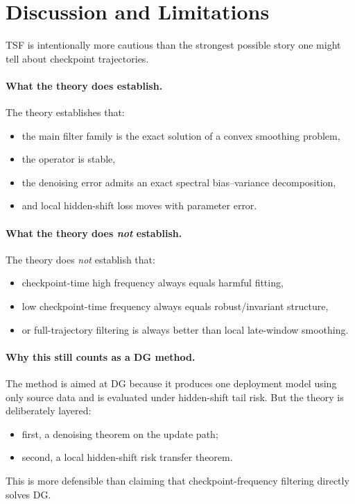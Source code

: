 \documentclass{article}
\newcommand{\tsf}{\textup{\textsc{TSF}}}
\begin{document}
\section{Discussion and Limitations}
\label{sec:discussion}

\tsf{} is intentionally more cautious than the strongest possible story one might tell about checkpoint trajectories.

\paragraph{What the theory does establish.}
The theory establishes that:
\begin{itemize}[leftmargin=1.4em]
    \item the main filter family is the exact solution of a convex smoothing problem,
    \item the operator is stable,
    \item the denoising error admits an exact spectral bias--variance decomposition,
    \item and local hidden-shift loss moves with parameter error.
\end{itemize}

\paragraph{What the theory does \emph{not} establish.}
The theory does \emph{not} establish that:
\begin{itemize}[leftmargin=1.4em]
    \item checkpoint-time high frequency always equals harmful fitting,
    \item low checkpoint-time frequency always equals robust/invariant structure,
    \item or full-trajectory filtering is always better than local late-window smoothing.
\end{itemize}

\paragraph{Why this still counts as a DG method.}
The method is aimed at DG because it produces one deployment model using only source data and is evaluated under hidden-shift tail risk. But the theory is deliberately layered:
\begin{itemize}[leftmargin=1.4em]
    \item first, a denoising theorem on the update path;
    \item second, a local hidden-shift risk transfer theorem.
\end{itemize}
This is more defensible than claiming that checkpoint-frequency filtering directly solves DG.
\end{document}
